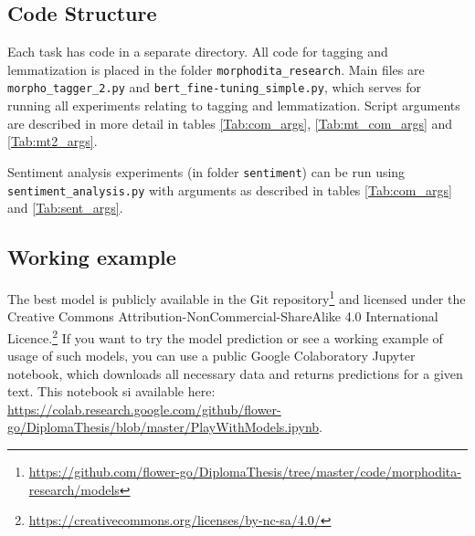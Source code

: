 \subsection{Code Structure}
Each task has code in a separate directory. All code for tagging and lemmatization is placed in the folder \texttt{morphodita\_research}. Main files are \texttt{morpho\_tagger\_2.py} and \texttt{bert\_fine-tuning\_simple.py}, which serves for running all experiments relating to tagging and lemmatization. Script arguments are described in more detail in tables \ref{Tab:com_args}, \ref{Tab:mt_com_args} and \ref{Tab:mt2_args}.
\par
Sentiment analysis experiments (in folder \texttt{sentiment}) can be run using\\ \texttt{sentiment\_analysis.py} with arguments as described in tables \ref{Tab:com_args} and \ref{Tab:sent_args}.

\subsection{Working example}
The best model is publicly available in the Git repository\footnote{\url{https://github.com/flower-go/DiplomaThesis/tree/master/code/morphodita-research/models}} %
 and licensed under the Creative Commons Attribution-NonCommercial-ShareAlike 4.0 International Licence.\footnote{\url{https://creativecommons.org/licenses/by-nc-sa/4.0/}} If you want to try the model prediction or see a working example of usage of such models, you can use a public Google Colaboratory \citep{colab} Jupyter notebook, which downloads all necessary data and returns predictions for a given text. This notebook si available here: \url{https://colab.research.google.com/github/flower-go/DiplomaThesis/blob/master/PlayWithModels.ipynb}. 


